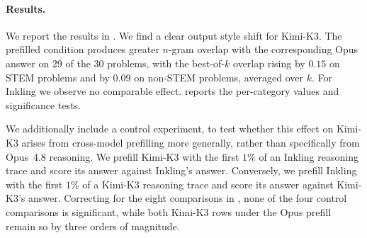 

\paragraph{Results.} We report the results in . We find a clear output style shift for Kimi-K3. The prefilled condition produces greater $n$-gram overlap with the corresponding Opus answer on 29 of the 30 problems, with the best-of-$k$ overlap rising by $0.15$ on STEM problems and by $0.09$ on non-STEM problems, averaged over $k$. For Inkling we observe no comparable effect.  reports the per-category values and significance tests.

We additionally include a control experiment, to test whether this effect on Kimi-K3 arises from cross-model prefilling more generally, rather than specifically from Opus~4.8 reasoning. We prefill Kimi-K3 with the first $1\%$ of an Inkling reasoning trace and score its answer against Inkling's answer. Conversely, we prefill Inkling with the first $1\%$ of a Kimi-K3 reasoning trace and score its answer against Kimi-K3's answer. Correcting for the eight comparisons in , none of the four control comparisons is significant, while both Kimi-K3 rows under the Opus prefill remain so by three orders of magnitude. 




